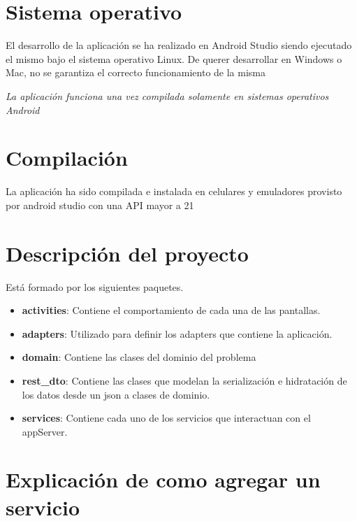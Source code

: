 \documentclass[a4paper,10pt,spanish]{sphinxmanual}
\begin{document}
\section{Sistema operativo}
\label{appAndroid:sistema-operativo}
El desarrollo de la aplicación se ha realizado en Android Studio siendo ejecutado el mismo bajo el sistema operativo Linux. De querer desarrollar en Windows o Mac, no se garantiza el correcto funcionamiento de la misma

\emph{La aplicación funciona una vez compilada solamente en sistemas operativos Android}


\section{Compilación}
\label{appAndroid:compilacion}
La aplicación ha sido compilada e instalada en celulares y emuladores provisto por android studio con una API mayor a 21


\section{Descripción del proyecto}
\label{appAndroid:descripcion-del-proyecto}
Está formado por los siguientes paquetes.
\begin{itemize}
\item {} 
\textbf{activities}: Contiene el comportamiento de cada una de las pantallas.

\item {} 
\textbf{adapters}: Utilizado para definir los adapters que contiene la aplicación.

\item {} 
\textbf{domain}: Contiene las clases del dominio del problema

\item {} 
\textbf{rest\_dto}: Contiene las clases que modelan la serialización e hidratación de los datos desde un json a clases de dominio.

\item {} 
\textbf{services}: Contiene cada uno de los servicios que interactuan con el appServer.

\end{itemize}


\section{Explicación de como agregar un servicio}
\label{appAndroid:explicacion-de-como-agregar-un-servicio}
\end{document}

